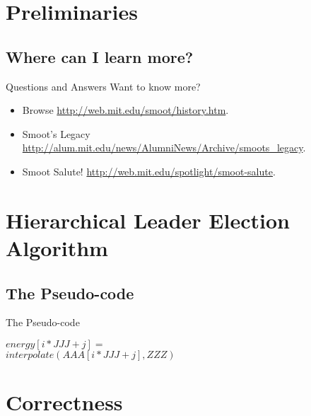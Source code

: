 \documentclass{beamer}
\begin{document}
\section{Preliminaries}
\subsection{Where can I learn more?}
\begin{frame}{Questions and Answers}
Want to know more?

\begin{itemize}
	\item Browse \url{http://web.mit.edu/smoot/history.htm}.
	\item Smoot's Legacy \url{http://alum.mit.edu/news/AlumniNews/Archive/smoots_legacy}.
	\item Smoot Salute! \url{http://web.mit.edu/spotlight/smoot-salute}.
\end{itemize}

\end{frame}

\section{Hierarchical Leader Election Algorithm}
\subsection{The Pseudo-code}

\begin{frame}{The Pseudo-code}

\begin{algorithm}[!H]
	\begin{algorithmic}[1]
		\STATE $energy[i*JJJ+j] =$ \\
		$ interpolate(AAA[i*JJJ+j], ZZZ)$
		\ENDFOR
		\ENDFOR
	\end{algorithmic}
	\caption{pseudocode for the calculation of }
	\label{alg:seq}
\end{algorithm}
\end{frame}

\section{Correctness}
\end{document}

